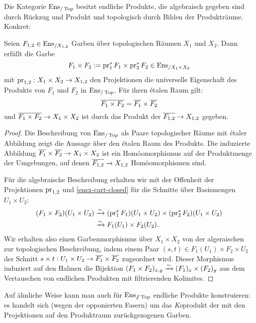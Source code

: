 Die Kategorie $\operatorname{Ens}_{/\operatorname{Top}}$ besitzt endliche Produkte, die
algebraisch gegeben sind durch Rückzug und Produkt und topologisch
durch Bilden der Produkträume. Konkret:
\begin{prop}
  Seien $F_{1,2} \in \operatorname{Ens}_{/X_{1,2}}$ Garben über topologischen Räumen
  $X_1$ und $X_2$. Dann erfüllt die Garbe
  \[ F_1 \times F_2 := \operatorname{pr}_1^* F_1 \times \operatorname{pr}_2^* F_2 \in \operatorname{Ens}_{/X_1 \times X_2} \]
  mit $\operatorname{pr}_{1,2}: X_1 \times X_2 \to X_{1,2}$ den Projektionen die
  universelle Eigenschaft des Produkts von $F_1$ und $F_2$ in
  $\operatorname{Ens}_{/\operatorname{Top}}$. Für ihren étalen Raum gilt:
  \[ \overline{F_1 \times F_2} = \overline{F_1} \times \overline{F_2} \]
  und $\overline{F_1 \times F_2} \to X_1 \times X_2$ ist durch das
  Produkt der $\overline{F_{1,2}} \to X_{1,2}$ gegeben.
\end{prop}
\begin{proof}
  Die Beschreibung von $\operatorname{Ens}_{/\operatorname{Top}}$ als Paare topologischer Räume
  mit étaler Abbildung zeigt die Aussage über den étalen Raum des
  Produkts. Die induzierte Abbildung $\overline{F_1}
  \times \overline{F_2} \to X_1 \times X_2$ ist ein Homöomorphismus
  auf der Produktmenge der Umgebungen, auf denen $\overline{F_{1,2}}
  \to X_{1,2}$ Homöomorphismen sind.
  
  Für die algebraische Beschreibung erhalten wir mit der Offenheit der
  Projektionen $\operatorname{pr}_{1,2}$ und \ref{ensx-cart-closed} für die Schnitte
  über Basismengen $U_1 \times U_2$:
  \begin{align*}
    (F_1 \times F_2)(U_1 \times U_2)
    &\xrightarrow[]{\sim} (\operatorname{pr}_1^* F_1)(U_1 \times U_2) \times (\operatorname{pr}_2^* F_2)(U_1 \times U_2) \\
    &\xrightarrow[]{\sim} F_1(U_1) \times F_2(U_2).
  \end{align*}
  Wir erhalten also einen Garbenmorphismus über $X_1 \times X_2$ von
  der algeraischen zur topologischen Beschreibung, indem einem Paar
  $(s, t) \in F_1(U_1) \times F_2 \times U_2$ der Schnitt $s \times t:
  U_1 \times U_2 \to \overline{F_1} \times \overline{F_2}$
  zugeordnet wird. Dieser Morphismus induziert auf den Halmen die
  Bijektion $(F_1 \times F_2)_{x, y} \xrightarrow[]{\sim} (F_1)_x \times (F_2)_y$ aus
  dem Vertauschen von endlichen Produkten mit filtrierenden Kolimites.
\end{proof}
\begin{bem}
  Auf ähnliche Weise kann man auch für $\operatorname{Ens}_{\mathbin{/\mkern-6mu/} \operatorname{Top}}$ endliche
  Produkte konstruieren: es handelt sich (wegen der opponierten
  Fasern) um das \emph{Ko}produkt der mit den Projektionen auf den
  Produktraum zurückgezogenen Garben.
\end{bem}

